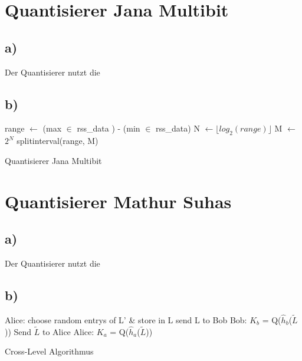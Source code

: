 \documentclass[12pt,a4paper]{article}
\begin{document}
\section{Quantisierer Jana Multibit}
\subsection*{a)}
Der Quantisierer nutzt die \\
\subsection*{b)}
\begin{algorithm}[H]
\DontPrintSemicolon
\SetAlgoLined
{}
range $\gets$ (max $\in$ rss\_data ) - (min $\in$ rss\_data) \;
N $\gets$$\lfloor log_2(range) \rfloor$\;
M $\gets$ $2^N$ \;
splitinterval(range, M)\;
\caption{Quantisierer Jana Multibit}
\end{algorithm}
\section{Quantisierer Mathur Suhas}
\subsection*{a)}
Der Quantisierer nutzt die \\
\subsection*{b)}
\begin{algorithm}[H]
\DontPrintSemicolon
\SetAlgoLined
{}
Alice:\;
choose random entrys of L' \& store in L\;
send L to Bob\;
Bob:\;
$K_b$ = Q($\hat{h}_b$($\tilde{L}$))\;
Send $\tilde{L}$ to Alice\;
Alice:\;
$K_a$ = Q($\hat{h}_a$($\tilde{L}$))\;
\caption{Cross-Level Algorithmus}
\end{algorithm}
\end{document}
